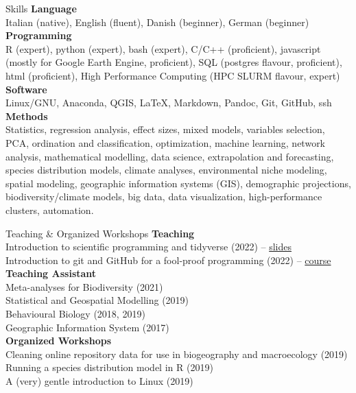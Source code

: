 \documentclass{resume} %
\begin{document}
\begin{rSection}{Skills}
{\bf Language}\\
Italian (native), English (fluent), Danish (beginner), German (beginner)\\
{\bf Programming}\\
R (expert), python (expert), bash (expert), C/C++ (proficient), javascript (mostly for Google Earth Engine, proficient), SQL (postgres flavour, proficient), html (proficient), High Performance Computing (HPC SLURM flavour, expert)\\
{\bf Software} \\
Linux/GNU, Anaconda, QGIS, \LaTeX, Markdown, Pandoc, Git, GitHub, ssh\\
{\bf Methods} \\
Statistics, regression analysis, effect sizes, mixed models, variables selection, PCA, ordination and classification, optimization, machine learning, network analysis, mathematical modelling, data science, extrapolation and forecasting, species distribution models, climate analyses, environmental niche modeling, spatial modeling, geographic information systems (GIS), demographic projections, biodiversity/climate models, big data, data visualization, high-performance clusters, automation.
\end{rSection}

\begin{rSection}{Teaching \& Organized Workshops}
{\bf Teaching} \\
Introduction to scientific programming and tidyverse (2022) -- \href{https://emilio-berti.github.io/teaching/tidyverse.html#(1)}{slides}\\
Introduction to git and GitHub for a fool-proof programming (2022) -- \href{https://emilio-berti.github.io/idiv-git-introduction/}{course}\\
\clearpage
{\bf Teaching Assistant} \\
Meta-analyses for Biodiversity (2021)\\
Statistical and Geospatial Modelling (2019)\\
Behavioural Biology (2018, 2019)\\
Geographic Information System (2017)\\
{\bf Organized Workshops}\\
Cleaning online repository data for use in biogeography and macroecology (2019)\\
Running a species distribution model in R (2019)\\
A (very) gentle introduction to Linux (2019)
\end{rSection}
\end{document}
